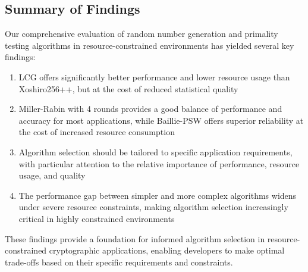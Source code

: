 \subsection{Summary of Findings}
Our comprehensive evaluation of random number generation and primality testing algorithms in resource-constrained environments has yielded several key findings:

\begin{enumerate}
    \item LCG offers significantly better performance and lower resource usage than Xoshiro256++, but at the cost of reduced statistical quality
    \item Miller-Rabin with 4 rounds provides a good balance of performance and accuracy for most applications, while Baillie-PSW offers superior reliability at the cost of increased resource consumption
    \item Algorithm selection should be tailored to specific application requirements, with particular attention to the relative importance of performance, resource usage, and quality
    \item The performance gap between simpler and more complex algorithms widens under severe resource constraints, making algorithm selection increasingly critical in highly constrained environments \cite{iot_survey}
\end{enumerate}

These findings provide a foundation for informed algorithm selection in resource-constrained cryptographic applications, enabling developers to make optimal trade-offs based on their specific requirements and constraints. 